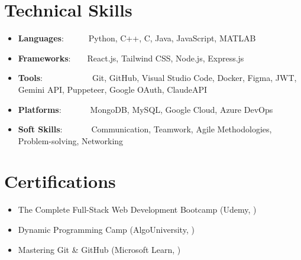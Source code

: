 \documentclass[a4paper,10pt]{article}
\newcommand{\resumeItem}[2]{
  \item{
    \textbf{#1}{:\hspace{0.5mm}#2 \vspace{-0.5mm}}
  }
}
\newcommand{\resumeSubItem}[2]{\resumeItem{#1}{#2}\vspace{-4pt}}
\newcommand{\resumeHeadingSkillStart}{\begin{itemize}[leftmargin=*,itemsep=1.7mm, rightmargin=2ex]}
\newcommand{\resumeItemListStart}{\begin{justify}\begin{itemize}[leftmargin=3ex, rightmargin=2ex, noitemsep,labelsep=1.2mm,itemsep=0mm]\small}
\newcommand{\resumeHeadingSkillEnd}{\end{itemize}\vspace{-2mm}}
\newcommand{\resumeItemListEnd}{\end{itemize}\end{justify}\vspace{-2mm}}
\begin{document}
\section{\textbf{Technical Skills}}
\resumeHeadingSkillStart

\resumeSubItem{Languages}{~~~~~~Python, C++, C, Java, JavaScript, MATLAB
}
\resumeSubItem{Frameworks}{~~~~React.js, Tailwind CSS, Node.js, Express.js
}
\resumeSubItem{Tools}{~~~~~~~~~~~~Git, GitHub, Visual Studio Code, Docker, Figma, JWT, Gemini API, Puppeteer, Google OAuth, ClaudeAPI
}
\resumeSubItem{Platforms}{~~~~~~~MongoDB, MySQL, Google Cloud, Azure DevOps
}
\resumeSubItem{Soft Skills}{~~~~~~~Communication, Teamwork, Agile Methodologies, Problem-solving, Networking
}

\resumeHeadingSkillEnd

\vspace{-1.5mm}

\vspace{-1mm}

\section{\textbf{Certifications}}
    \resumeItemListStart
\item The Complete Full-Stack Web Development Bootcamp (Udemy, )
\item Dynamic Programming Camp (AlgoUniversity, )
\item Mastering Git \& GitHub (Microsoft Learn, )
    \resumeItemListEnd
\vspace{-4mm}
\end{document}
